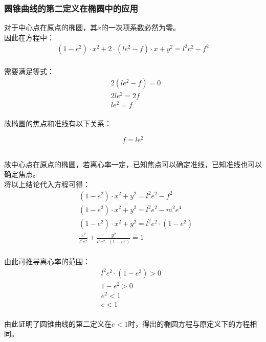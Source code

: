 \documentclass[UTF8]{ctexart}
\begin{document}
\newpage

\subsubsection{圆锥曲线的第二定义在椭圆中的应用}
    \setcounter{equation}{0}
    对于中心点在原点的椭圆，其$x$的一次项系数必然为零。\\[3mm]
    因此在方程中：
    \begin{align}
        \left(1-e^2\right)\cdot x^2+2\cdot\left(le^2-f\right)\cdot x+y^2=l^2e^2-f^2
    \end{align}\\
    需要满足等式：
    \begin{align}
        &2(le^2-f)=0\\[3mm]
        &2le^2=2f\\[3mm]
        &le^2=f
    \end{align}\\
    故椭圆的焦点和准线有以下关系：
    \begin{large}
        \begin{equation*}
            f=le^2
        \end{equation*}
    \end{large}\\
    故中心点在原点的椭圆，若离心率一定，已知焦点可以确定准线，已知准线也可以确定焦点。\\[10mm]
    将以上结论代入方程可得：
    \begin{align}
        &\left(1-e^2\right)\cdot x^2+y^2=l^2e^2-f^2\\[3mm]
        &\left(1-e^2\right)\cdot x^2+y^2=l^2e^2-m^2e^4\\[3mm]
        &\left(1-e^2\right)\cdot x^2+y^2=l^2e^2\cdot\left(1-e^2\right)\\[3mm]
        &\frac{x^2}{l^2e^2}+\frac{y^2}{l^2e^2\cdot\left(1-e^2\right)}=1
    \end{align}\\
    由此可推导离心率的范围：
    \begin{align}
        &l^2e^2\cdot\left(1-e^2\right)>0~~~~~~\\[3mm]
        &1-e^2>0\\[3mm]
        &e^2<1\\[3mm]
        &e<1
    \end{align}\\
    由此证明了圆锥曲线的第二定义在$e<1$时，得出的椭圆方程与原定义下的方程相同。

\newpage
\end{document}
